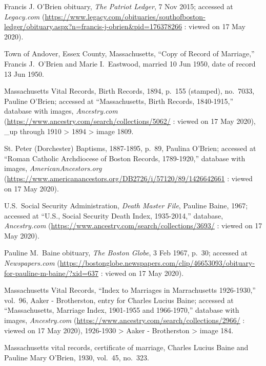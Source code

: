 \begin{thebibliography}{999}
	Francis J. O'Brien obituary, \textit{The Patriot Ledger}, 7 Nov 2015; accessed at \textit{Legacy.com} (\url{https://www.legacy.com/obituaries/southofboston-ledger/obituary.aspx?n=francis-j-obrien\&pid=176378266} : viewed on 17 May 2020).
	
	Town of Andover, Essex County, Massachusetts, ``Copy of Record of Marriage,'' Francis J.\ O'Brien and Marie I.\ Eastwood, married 10 Jun 1950, date of record 13 Jun 1950.
	
	Massachusetts Vital Records, Birth Records, 1894, p.\ 155 (stamped), no.\ 7033, Pauline O'Brien; accessed at ``Massachusetts, Birth Records, 1840-1915,'' database with images, \textit{Ancestry.com} (\url{https://www.ancestry.com/search/collections/5062/} : viewed on 17 May 2020), \_up through 1910 > 1894 > image 1809.

	St. Peter (Dorchester) Baptisms, 1887-1895, p.\ 89, Paulina O'Brien; accessed at ``Roman Catholic Archdiocese of Boston Records, 1789-1920,'' database with images, \textit{AmericanAncestors.org} (\url{https://www.americanancestors.org/DB2726/i/57120/89/1426642661} : viewed on 17 May 2020).
	
	U.S.\ Social Security Administration, \textit{Death Master File}, Pauline Baine, 1967; accessed at ``U.S., Social Security Death Index, 1935-2014,'' database, \textit{Ancestry.com} (\url{https://www.ancestry.com/search/collections/3693/} : viewed on 17 May 2020).
	
	Pauline M.\ Baine obituary, \textit{The Boston Globe}, 3 Feb 1967, p.\ 30; accessed at \textit{Newspapers.com} (\url{https://bostonglobe.newspapers.com/clip/46653093/obituary-for-pauline-m-baine/?xid=637} : viewed on 17 May 2020).
	
	Massachusetts Vital Records, ``Index to Marriages in Marrachusetts 1926-1930,'' vol.\ 96, Aaker - Brotherston, entry for Charles Lucius Baine; accessed at ``Massachusetts, Marriage Index, 1901-1955 and 1966-1970,'' database with images, \textit{Ancestry.com} (\url{https://www.ancestry.com/search/collections/2966/} : viewed on 17 May 2020), 1926-1930 > Aaker - Brotherston > image 184.
	
	Massachusetts vital records, certificate of marriage, Charles Lucius Baine and Pauline Mary O'Brien, 1930, vol.\ 45, no.\ 323.
	

\end{thebibliography}
